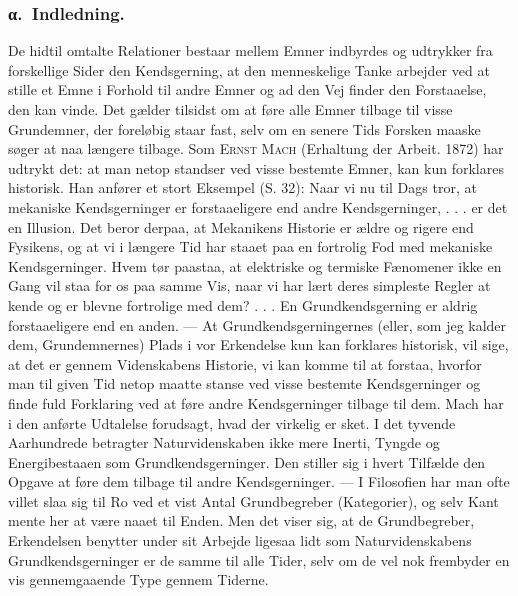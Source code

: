 \documentclass[12pt]{article}
\newcommand{\opage}[1]{\marginnote{\footnotesize\textit{[#1]}}}
\begin{document}
\subsubsection*{α.~Indledning.}
%
\label{sec:3d-alpha}%
\noindent De hidtil omtalte Relationer bestaar mellem Emner indbyrdes og
udtrykker fra forskellige Sider den Kendsgerning, at den menneskelige
Tanke arbejder ved at stille et Emne i Forhold til andre Emner og ad den
Vej finder den Forstaaelse, den kan vinde. Det gælder tilsidst om at føre
alle Emner tilbage til visse Grundemner, der foreløbig staar fast, selv
om en senere Tids Forsken maaske søger at naa længere tilbage. Som
\textsc{Ernst Mach} (Erhaltung der Arbeit. 1872) har udtrykt det: at man
netop standser ved visse bestemte Emner, kan kun forklares historisk. Han
anfører et stort Eksempel (S. 32): \guillemotright Naar vi nu til Dags
tror, at mekaniske Kendsgerninger er forstaaeligere end andre
Kendsgerninger, . . . er det en Illusion. Det beror derpaa, at Mekanikens
Historie er ældre og rigere end Fysikens, og at vi i længere Tid har
staaet paa en fortrolig Fod med mekaniske Kendsgerninger. Hvem tør
paastaa, at elektriske og termiske Fænomener ikke en Gang vil staa for os
paa samme Vis, naar vi har lært deres simpleste Regler at kende og er
blevne fortrolige med dem? . . . En Grundkendsgerning er aldrig
forstaaeligere end en anden\guillemotleft . --- At Grundkendsgerningernes
(eller, som jeg kalder dem, Grundemnernes) Plads i vor Erkendelse kun kan
forklares historisk, vil sige, at det er gennem Videnskabens Historie, vi
kan komme til at forstaa, hvorfor man til given Tid netop maatte stanse
ved visse bestemte Kendsgerninger og finde fuld Forklaring ved at føre
andre Kendsgerninger tilbage til dem. Mach har i den anførte Udtalelse
forudsagt, hvad der virkelig er sket. I det tyvende Aarhundrede betragter
Naturvidenskaben ikke mere Inerti, Tyngde og Energibestaaen som
Grundkendsgerninger. Den stiller sig i hvert Tilfælde den Opgave at føre
dem tilbage
\opage{59} \setcounter{footnote}{0}
til andre Kendsgerninger. --- I Filosofien har man ofte villet slaa sig
til Ro ved et vist Antal Grundbegreber (Kategorier), og selv Kant mente
her at være naaet til Enden. Men det viser sig, at de Grundbegreber,
Erkendelsen benytter under sit Arbejde ligesaa lidt som
Naturvidenskabens Grundkendsgerninger er de samme til alle Tider, selv om
de vel nok frembyder en vis gennemgaaende Type gennem Tiderne.
\end{document}

